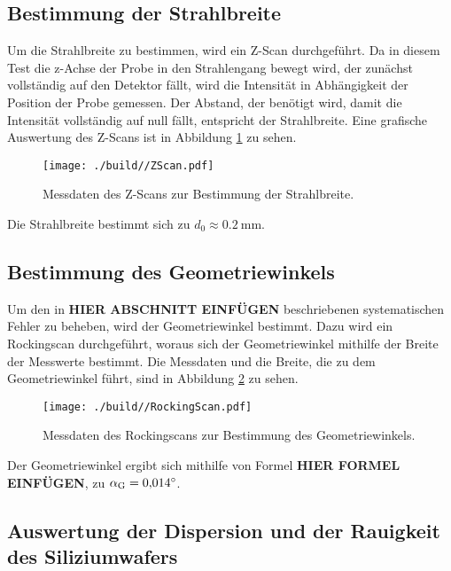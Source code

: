 \subsection{Bestimmung der Strahlbreite}
\label{subsec:Strahlbreite}

Um die Strahlbreite zu bestimmen, wird ein Z-Scan durchgeführt.
Da in diesem Test die z-Achse der Probe in den Strahlengang bewegt wird, der zunächst vollständig auf den Detektor fällt, wird die Intensität in Abhängigkeit der Position der Probe gemessen.
Der Abstand, der benötigt wird, damit die Intensität vollständig auf null fällt, entspricht der Strahlbreite.
Eine grafische Auswertung des Z-Scans ist in Abbildung \ref{fig:ZScan} zu sehen.
\begin{figure}[H]
    \centering
    \texttt{[image: ./build//ZScan.pdf]}
    \caption{Messdaten des Z-Scans zur Bestimmung der Strahlbreite.}
    \label{fig:ZScan}
\end{figure}
\noindent
Die Strahlbreite bestimmt sich zu $d_0\approx\SI{0.2}{\milli\meter}$.

\subsection{Bestimmung des Geometriewinkels}
\label{subsec:Geometriewinkel}

Um den in \textbf{HIER ABSCHNITT EINFÜGEN} beschriebenen systematischen Fehler zu beheben, wird der Geometriewinkel bestimmt.
Dazu wird ein Rockingscan durchgeführt, woraus sich der Geometriewinkel mithilfe der Breite der Messwerte bestimmt.
Die Messdaten und die Breite, die zu dem Geometriewinkel führt, sind in Abbildung \ref{fig:RockingScan} zu sehen.
\begin{figure}[H]
    \centering
    \texttt{[image: ./build//RockingScan.pdf]}
    \caption{Messdaten des Rockingscans zur Bestimmung des Geometriewinkels.}
    \label{fig:RockingScan}
\end{figure}
\noindent
Der Geometriewinkel ergibt sich mithilfe von Formel \textbf{HIER FORMEL EINFÜGEN}, zu $\alpha_{\text G} = \SI{0.014}{\degree}$.

\subsection{Auswertung der Dispersion und der Rauigkeit des Siliziumwafers}
\label{subsec:Dispersion}

